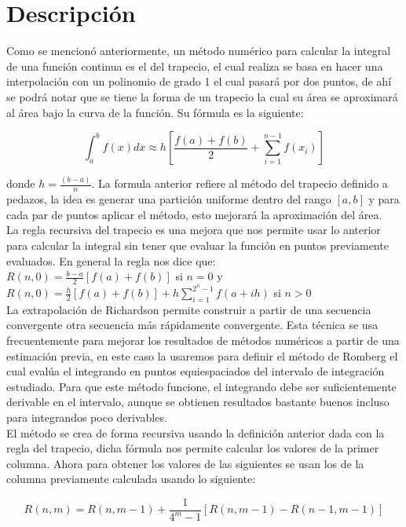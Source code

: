 \documentclass[12pt]{article}
\begin{document}
\section{Descripción}
Como se mencionó anteriormente, un método numérico para calcular la integral de una función continua es el del trapecio, el cual realiza se basa en hacer una interpolación con un polinomio de grado 1 el cual pasará por dos puntos, de ahí se podrá notar que se tiene la forma de un trapecio la cual su área se aproximará al área bajo la curva de la función. Su fórmula es la siguiente:

$$\int_{a}^{b}f(x) dx \approx h [\frac{f(a) + f(b)}{2} + \sum_{i=1}^{n - 1}f(x_i)]$$

donde $h = \frac{(b - a)}{n}$. La formula anterior refiere al método del trapecio definido a pedazos, la idea es generar una partición uniforme dentro del rango $[a, b]$ y para cada par de puntos aplicar el método, esto mejorará la aproximación del área.\\

La regla recursiva del trapecio es una mejora que nos permite usar lo anterior para calcular la integral sin tener que evaluar la función en puntos previamente evaluados. En general la regla nos dice que:\\

$R(n, 0) = \frac{b - a}{2}[f(a) + f(b)]$ si $n = 0$ y $R(n, 0) = \frac{h}{2}[f(a) + f(b)] + h \sum_{i = 1}^{2^n - 1} f(a + ih)$ si $n > 0$\\

La extrapolación de Richardson permite construir a partir de una secuencia convergente otra secuencia más rápidamente convergente. Esta técnica se usa frecuentemente para mejorar los resultados de métodos numéricos a partir de una estimación previa, en este caso la usaremos para definir el método de Romberg el cual evalúa el integrando en puntos equiespaciados del intervalo de integración estudiado. Para que este método funcione, el integrando debe ser suficientemente derivable en el intervalo, aunque se obtienen resultados bastante buenos incluso para integrandos poco derivables.\\
El método se crea de forma recursiva usando la definición anterior dada con la regla del trapecio, dicha fórmula nos permite calcular los valores de la primer columna. Ahora para obtener los valores de las siguientes se usan los de la columna previamente calculada usando lo siguiente:

$$R(n, m) = R(n, m - 1) + \frac{1}{4^m - 1}[R(n, m - 1) - R(n - 1, m - 1)]$$
\end{document}
